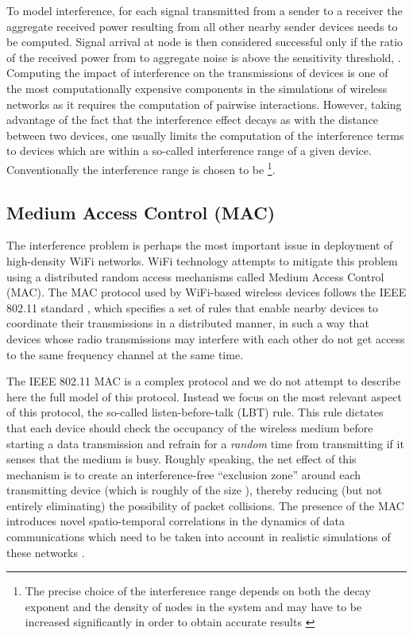 \documentclass{elsart}
\begin{document}
To model interference, for each signal transmitted 
from a sender  to a receiver   
the aggregate received power resulting from all other  nearby sender 
devices needs to be computed. Signal arrival at node  is then 
considered successful only if  the ratio of the 
received power from   to aggregate noise is above the sensitivity 
threshold, . Computing the impact of interference on the transmissions of devices 
is one of the most computationally expensive components in the  simulations
of wireless networks as it requires the computation of  pairwise 
interactions. However, taking advantage of the fact that the 
interference effect decays as  with the distance between two 
devices, one usually limits the computation of the interference terms 
to devices which are within a so-called interference range of  a given 
device. Conventionally the interference range is chosen to be 
\footnote{The precise choice of the interference range 
depends on both the decay exponent  and the density of 
nodes in the system and may have to be increased significantly 
in order to obtain accurate results \cite{bogodia2}}.


\subsection{Medium Access Control (MAC)}
The interference problem is perhaps the most important issue 
in deployment of high-density WiFi
networks. WiFi technology attempts to mitigate  this problem 
using  a distributed random access mechanisms called Medium Access Control
(MAC). 
The MAC protocol used by  WiFi-based wireless devices follows the 
IEEE 802.11 standard \cite{wifi}, which specifies a set of
rules that enable nearby devices to coordinate their transmissions 
in a distributed manner,
in such a way that devices whose radio transmissions may interfere with each 
other do not get access to the same frequency channel at the same time. 

The IEEE 802.11 MAC is a   
complex protocol and we do not attempt to describe here 
the full model of this protocol.
Instead we focus on the most relevant aspect of this protocol, the so-called 
listen-before-talk (LBT) rule. This rule  dictates that each device should 
check the occupancy of the wireless medium before starting a data transmission 
and refrain for a {\it random} time from  
transmitting if it senses that the medium is busy.
Roughly speaking, the net effect of this mechanism is 
to create an interference-free ``exclusion zone'' around each transmitting 
device (which is roughly of the size ), 
thereby reducing (but not entirely eliminating) the possibility of packet 
collisions. 
The presence of the MAC introduces novel spatio-temporal correlations 
in the dynamics of data communications which need to be taken into account 
in realistic simulations of these networks \cite{maziar-worms}.
\end{document}
